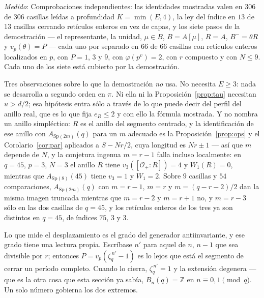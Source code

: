 \documentclass[11pt,a4paper]{article}
\theoremstyle{definition}
\newcommand{\Sp}{\mathrm{Sp}}
\newcommand{\ZZ}{\mathbb{Z}}
\newcommand{\cO}{\mathcal{O}}
\newcommand{\medido}[1]{\emph{Medido}: #1}
\begin{document}
\medskip

\medido{Comprobaciones independientes:
las identidades mostradas valen en $306$ de $306$ casillas le\'idas a profundidad $K=\min(E,4)$, la
ley del \'indice en $13$ de $13$ casillas cerrando ret\'iculos enteros en vez de capas, y los siete
pasos de la demostraci\'on --- el representante, la unidad, $\mu\in B$, $B=A[\mu]$, $R=A$,
$B^-=\theta R$ y $v_p(\theta)=P$ --- cada uno por separado en $66$ de $66$ casillas con
ret\'iculos enteros localizados en $p$, con $P=1$, $3$ y $9$, con $\varphi(p^v)=2$, con $r$
compuesto y con $N\le9$. Cada uno de los siete est\'a cubierto por la demostraci\'on.}

Tres observaciones sobre lo que la demostraci\'on \emph{no} usa. No necesita $E\ge3$: nada se
desarrolla a segundo orden en $\pi$. Ni ella ni la Proposici\'on~\ref{prop:tau} necesitan
$u>d/2$; esa hip\'otesis entra s\'olo a trav\'es de lo que \cite{Cond} puede decir
del perfil del anillo real, que es lo que fija $e_R\le2$ y con ello la f\'ormula mostrada. Y no
nombra un anillo simpl\'ectico: $R$ es el anillo del segmento centrado, y la identificaci\'on de
ese anillo con $A_{\Sp(2m)}(q)$ para un $m$ adecuado es la Proposici\'on~\ref{prop:ops} y el
Corolario~\ref{cor:par} aplicados a $S-Nr/2$, cuya longitud es $Nr\pm1$ --- as\'i que $m$ depende
de $N$, y la conjetura ingenua $m=r-1$ falla incluso localmente: en $q=45$, $p=3$, $N=3$ el anillo $R$
tiene $v_3([\cO_+:R])=4$ y $W_1(R)=0$, mientras que $A_{\Sp(8)}(45)$ tiene $v_3=1$ y $W_1=2$. Sobre $9$ casillas y
$54$ comparaciones, $A_{\Sp(2m)}(q)$ con $m=r-1$, $m=r$ y $m=(q-r-2)/2$ dan la misma imagen
truncada mientras que $m=r-2$ y $m=r+1$ no, y $m=r-3$ s\'olo en las dos casillas de $q=45$, y los
ret\'iculos enteros de los tres ya son distintos en $q=45$, de \'indices $75$, $3$ y $3$.

Lo que mide el desplazamiento es el grado del generador antiinvariante, y ese grado tiene una
lectura propia. Escr\'ibase $n'$ para aquel de $n$, $n-1$ que sea divisible por $r$; entonces
$P=v_p(\zeta_q^{\,n'}-1)$ es lo lejos que est\'a el segmento de cerrar un per\'iodo completo.
Cuando lo cierra, $\zeta_q^{\,n'}=1$ y la extensi\'on degenera --- que es la otra cosa que esta
secci\'on ya sab\'ia, $B_n(q)=\ZZ$ en $n\equiv0,1\pmod q$. Un solo n\'umero gobierna los dos
extremos.
\end{document}
